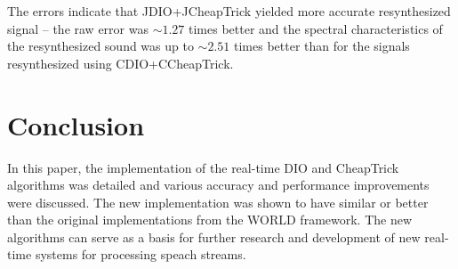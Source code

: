 \documentclass[a4paper]{article}
\begin{document}
The errors indicate that JDIO+JCheapTrick yielded more accurate resynthesized signal -- the raw error was $\sim1.27$ times better and the spectral characteristics of the resynthesized sound was up to $\sim2.51$ times better than for the signals resynthesized using CDIO+CCheapTrick.

\section{Conclusion}

In this paper, the implementation of the real-time DIO and CheapTrick algorithms was detailed and various accuracy and performance improvements were discussed. The new implementation was shown to have similar or better than the original implementations from the WORLD framework. The new algorithms can serve as a basis for further research and development of new real-time systems for processing speach streams.



\end{document}
